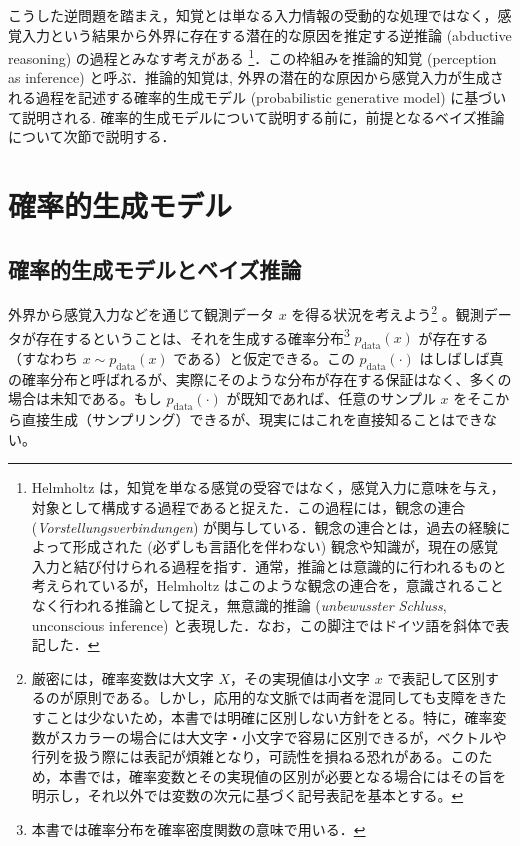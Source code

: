 \documentclass[titlepage]{ltjsbook}
\begin{document}
こうした逆問題を踏まえ，知覚とは単なる入力情報の受動的な処理ではなく，感覚入力という結果から外界に存在する潜在的な原因を推定する逆推論 (abductive reasoning) の過程とみなす考えがある \citep{helmholtz1867, mumford1992computational, kawato1993forward, friston2003learning}\footnote{Helmholtz は，知覚を単なる感覚の受容ではなく，感覚入力に意味を与え，対象として構成する過程であると捉えた．この過程には，観念の連合 (\textit{Vorstellungsverbindungen}) が関与している．観念の連合とは，過去の経験によって形成された (必ずしも言語化を伴わない) 観念や知識が，現在の感覚入力と結び付けられる過程を指す．通常，推論とは意識的に行われるものと考えられているが，Helmholtz はこのような観念の連合を，意識されることなく行われる推論として捉え，無意識的推論 (\textit{unbewusster Schluss}, unconscious inference)  と表現した．なお，この脚注ではドイツ語を斜体で表記した．}．この枠組みを推論的知覚 (perception as inference) と呼ぶ．推論的知覚は, 外界の潜在的な原因から感覚入力が生成される過程を記述する確率的生成モデル (probabilistic generative model) に基づいて説明される. 確率的生成モデルについて説明する前に，前提となるベイズ推論について次節で説明する．

\section{確率的生成モデル}
\subsection{確率的生成モデルとベイズ推論}
外界から感覚入力などを通じて観測データ $x$ を得る状況を考えよう\footnote{厳密には，確率変数は大文字 $X$，その実現値は小文字 $x$ で表記して区別するのが原則である。しかし，応用的な文脈では両者を混同しても支障をきたすことは少ないため，本書では明確に区別しない方針をとる。特に，確率変数がスカラーの場合には大文字・小文字で容易に区別できるが，ベクトルや行列を扱う際には表記が煩雑となり，可読性を損ねる恐れがある。このため，本書では，確率変数とその実現値の区別が必要となる場合にはその旨を明示し，それ以外では変数の次元に基づく記号表記を基本とする。} 。観測データが存在するということは、それを生成する確率分布\footnote{本書では確率分布を確率密度関数の意味で用いる．} $p_{\mathrm{data}}(x)$ が存在する（すなわち $x \sim p_{\mathrm{data}}(x)$ である）と仮定できる。この $p_{\mathrm{data}}(\cdot)$ はしばしば真の確率分布と呼ばれるが、実際にそのような分布が存在する保証はなく、多くの場合は未知である。もし $p_{\mathrm{data}}(\cdot)$ が既知であれば、任意のサンプル $x$ をそこから直接生成（サンプリング）できるが、現実にはこれを直接知ることはできない。
\end{document}

